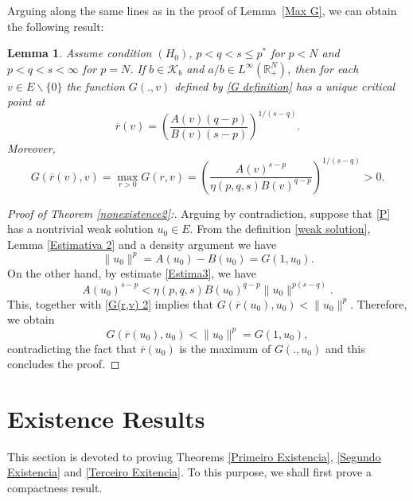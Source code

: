 \documentclass[12pt,reqno]{amsart}
\newtheorem{lemma}[theorem]{Lemma}
\begin{document}
Arguing along the same lines as in the proof of Lemma~\ref{Max G}, we can obtain the following result:

\begin{lemma}  Assume condition $(H_0)$, $p<q<s\leq p^*$ for $p<N$ and $p<q<s< \infty$ for $p=N$. If $b\in\mathcal{K}_b$ and $a/b \in L^\infty(\mathds{R}^N_+)$, then for each $v \in E\backslash\{0\}$  the function $G(.,v)$ defined by \eqref{G definition} has a unique critical point at 	
		\begin{equation}\label{critical point r(v) 2}
			\overline{r}(v)=\left(\frac{A(v)(q-p)}{B(v)(s-p)}\right)^{1/(s-q)}.
		\end{equation}
		Moreover, 
		\begin{equation}\label{G(r,v) 2}
			G(\overline{r}(v),v)=	\max_{r>0}G(r,v)=\left(\frac{A(v)^{s-p}}{\eta(p,q,s) B(v)^{q-p}}\right)^{1/(s-q)}>0.
		\end{equation}
		\end{lemma}

\begin{proof}[Proof of Theorem \ref{nonexistence2}:] 
Arguing by contradiction, suppose that \eqref{P} has a nontrivial weak solution $u_0\in E$. From the definition \eqref{weak solution}, Lemma \ref{Estimativa 2} and a density argument we have
\begin{equation}\label{Existence2}
			\|u_0\|^p=A(u_0)-B(u_0)=G(1,u_0).
		\end{equation}
On the other hand, by estimate \eqref{Estima3}, we have 
		\begin{equation*}
			A(u_0)^{s-p}<\eta(p,q,s)B(u_0)^{q-p}\|u_0\|^{p(s-q)}.
		\end{equation*}
		This, together with \eqref{G(r,v) 2} implies that 
	$
G(\overline{r}(u_0),u_0)<\|u_0\|^p.
	$
Therefore, we obtain 
$$
G(\overline{r}(u_0),u_0)<\|u_0\|^p=G(1,u_0),
$$
contradicting the fact that $\overline{r}(u_0)$ is the maximum of $G(.,u_0)$ and this concludes the proof.
\end{proof}
	
	
	\section{Existence Results}
	This section is devoted to proving Theorems \ref{Primeiro Existencia}, \ref{Segundo Existencia} and \ref{Terceiro Exitencia}. To this purpose, we shall first prove a compactness result.
\end{document}
